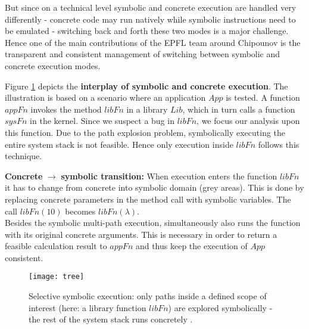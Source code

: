 But since on a technical level symbolic and concrete execution are handled very differently - concrete code may run natively while symbolic instructions need to be emulated - switching back and forth these two modes is a major challenge.
Hence one of the main contributions of the EPFL team around Chipounov is the transparent and consistent management of switching between symbolic and concrete execution modes.


Figure \ref{fig:ssetree} depicts the \textbf{interplay of symbolic and concrete execution}.
The illustration is based on a scenario where an application $App$ is tested.
A function $appFn$ invokes the method $libFn$ in a library $Lib$, which in turn calls a function $sysFn$ in the kernel.
Since we suspect a bug in $libFn$, we focus our analysis upon this function.
Due to the path explosion problem, symbolically executing the entire system stack is not feasible.
Hence only execution inside $libFn$ follows this technique.

\medskip
\textbf{Concrete} $\rightarrow$ \textbf{symbolic transition:}
When execution enters the function $libFn$ it has to change from concrete into symbolic domain (grey areas).
This is done by replacing concrete parameters in the method call with symbolic variables.
The call $libFn(10)$ becomes $libFn(\lambda)$.\\
Besides the symbolic multi-path execution, \sse simultaneously also runs the function with its original concrete arguments.
This is necessary in order to return a feasible calculation result to $appFn$ and thus keep the execution of $App$ consistent.


\begin{figure}
\texttt{[image: tree]}
\caption{Selective symbolic execution: only paths inside a defined scope of interest (here: a library function $libFn$) are explored symbolically - the rest of the system stack runs concretely \cite{chip14s2e}.}
\label{fig:ssetree}
\end{figure}

